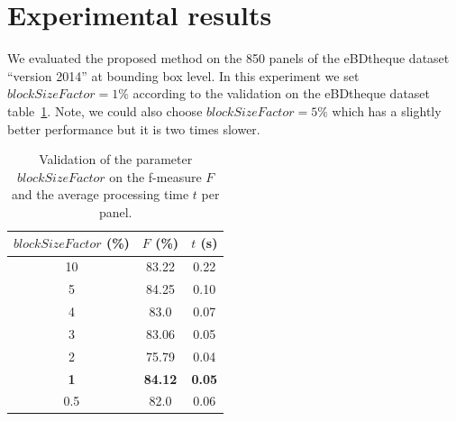 

\section{Experimental results}
\label{sec:pe:experimental_results}
We evaluated the proposed method on the 850 panels of the eBDtheque dataset~\cite{Guerin2013} ``version 2014'' at bounding box level.
In this experiment we set $blockSizeFactor = 1\%$ according to the validation on the eBDtheque dataset~\cite{Guerin2013} table~\ref{tab:blockSizeFactor_validation}.
Note, we could also choose $blockSizeFactor = 5\%$ which has a slightly better performance but it is two times slower.
 

  \begin{table}[ht]
    \centering
    \caption{Validation of the parameter $blockSizeFactor$ on the f-measure $F$ and the average processing time $t$ per panel.}
    \begin{tabular}{|c|c|c|}
		\hline
		$blockSizeFactor$ (\%) & $F$ (\%) 	&$t$ (s)\\
		\hline 
		10 & 83.22 & 0.22 \\
		\hline
		5 & 84.25 & 0.10 \\
		\hline
		4 & 83.0 & 0.07 \\ 
		\hline
		3 & 83.06 & 0.05 \\
		\hline
		2 & 75.79 & 0.04 \\ 
		\hline
		\textbf{1} & \textbf{84.12} & \textbf{0.05} \\
		\hline
		0.5 & 82.0 & 0.06 \\
		\hline

	\end{tabular}
    \label{tab:blockSizeFactor_validation}
  \end{table}%

